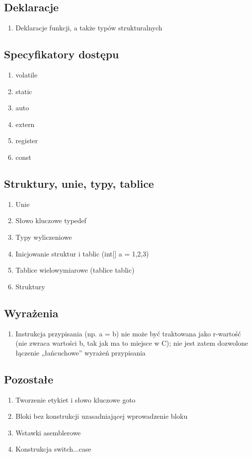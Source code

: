 \documentclass[a4paper,twoside,openright,11pt]{report}
\begin{document}
  \subsection {Deklaracje}
    \begin{enumerate}
      \item Deklaracje funkcji, a także typów strukturalnych 
    \end{enumerate}
  \subsection {Specyfikatory dostępu}
    \begin{enumerate}
      \item volatile
      \item static
      \item auto
      \item extern
      \item register
      \item const
    \end{enumerate}
  \subsection {Struktury, unie, typy, tablice}
    \begin{enumerate}
      \item Unie
      \item Słowo kluczowe typedef
      \item Typy wyliczeniowe
      \item Inicjowanie struktur i tablic (int[] a = {1,2,3})
      \item Tablice wielowymiarowe (tablice tablic) 
      \item Struktury
    \end{enumerate}
  \subsection {Wyrażenia}
    \begin{enumerate}
      \item Instrukcja przypisania (np. a = b) nie może być traktowana jako r-wartość (nie zwraca wartości b, tak jak ma to miejsce w C); nie jest zatem dozwolone łączenie „łańcuchowe” wyrażeń przypisania
    \end{enumerate}
  \subsection {Pozostałe}
    \begin{enumerate}
      \item Tworzenie etykiet i słowo kluczowe goto
      \item Bloki bez konstrukcji uzasadniającej wprowadzenie bloku
      \item Wstawki asemblerowe
      \item Konstrukcja switch...case
    \end{enumerate}
\end{document}
